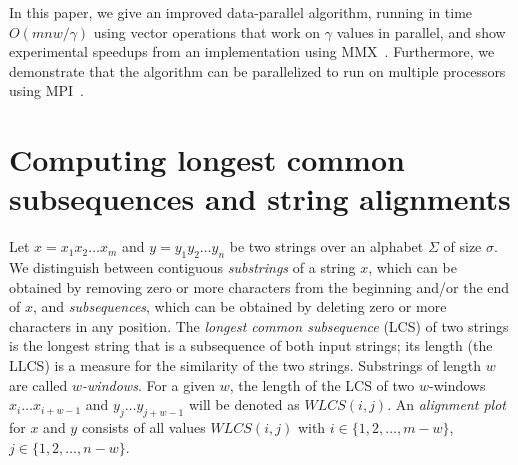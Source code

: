 \documentclass{IOS-Book-Article}     \usepackage{amsmath}
\theoremstyle{plain}
\theoremstyle{definition}
\begin{document}
In this paper, we give an improved data-parallel algorithm, running in time
$O(mnw/\gamma)$ using vector operations that work on $\gamma$ values in
parallel, and show experimental speedups from an implementation using
MMX~\cite{Intel:09}. Furthermore, we demonstrate that the algorithm can be
parallelized to run on multiple processors using MPI~\cite{Snir+:95}.

\section{Computing longest common subsequences and string
alignments}\label{sec:lcs} 
Let $x = x_1 x_2 \ldots x_m$ and $y = y_1 y_2 \ldots
y_n$ be two strings over an alphabet $\Sigma$ of size $\sigma$. We distinguish between contiguous
\textit{substrings} of a string $x$, which can be obtained by removing zero or
more characters from the beginning and/or the end of $x$, and \textit{subsequences},
which can be obtained by deleting zero or more characters in any position.
The \textit{longest common subsequence} (LCS) of two strings is the longest
string that is a subsequence of both input strings; its length (the LLCS) is a
measure for the similarity of the two strings.
Substrings of length $w$ are called \textit{$w$-windows}.
For a given $w$, the length of the LCS of two $w$-windows $x_i \ldots x_{i+w-1}$
and $y_j \ldots y_{j+w-1}$ will be denoted as $\mathit{WLCS}(i,j)$. 
An \textit{alignment plot} for $x$ and $y$ consists of all values
$\mathit{WLCS}(i,j)$ with $i \in \{1, 2, \ldots, m-w\}$, $j \in \{1, 2, \ldots, n-w \}$.
\end{document}
